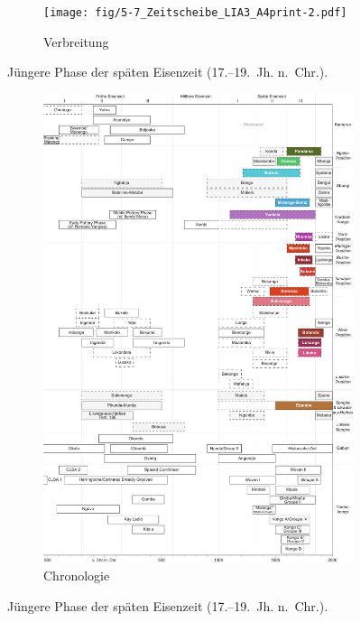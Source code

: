 \begin{figure}[p]
	\centering
	\begin{subfigure}[b]{\textwidth}
		\centering
		\texttt{[image: fig/5-7\_Zeitscheibe\_LIA3\_A4print-2.pdf]}
		\vspace{4cm}
		\caption{Verbreitung}
		\label{fig:LIA3_Karte}
	\end{subfigure}
	\caption{Jüngere Phase der späten Eisenzeit (17.--19.~Jh. n.~Chr.).}
\end{figure}
\addtocounter{figure}{-1}
\begin{figure}[p]
	\begin{subfigure}[b]{\textwidth}
		\setcounter{subfigure}{1}
		\centering
		\includegraphics[height = .9\textheight]{fig/Chronologiesystem_v4_Zeitscheibe_LIA3.pdf}
		\caption{Chronologie}
		\label{fig:LIA3_Chronologie}
	\end{subfigure}
	\caption{Jüngere Phase der späten Eisenzeit (17.--19.~Jh. n.~Chr.).}
	\label{fig:LIA3}
\end{figure}

